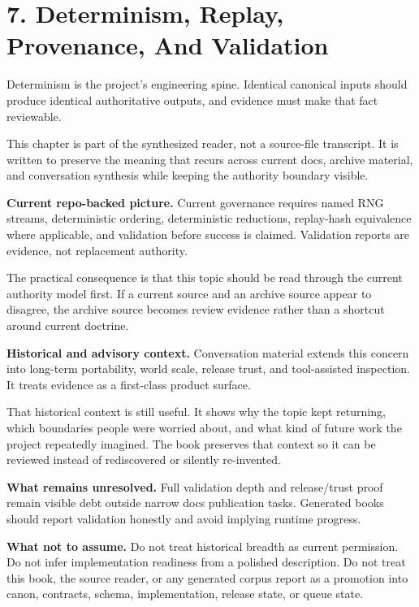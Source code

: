 \documentclass[10.5pt,a4paper,openany]{book}
\begin{document}
\section{7. Determinism, Replay, Provenance, And Validation}

Determinism is the project's engineering spine.\allowbreak{} Identical canonical inputs should produce identical authoritative outputs, and evidence must make that fact reviewable.\allowbreak{}


This chapter is part of the synthesized reader, not a source-\allowbreak{}file transcript.\allowbreak{} It is written to preserve the meaning that recurs across current docs, archive material, and conversation synthesis while keeping the authority boundary visible.\allowbreak{}


\textbf{Current repo-backed picture.} Current governance requires named RNG streams, deterministic ordering, deterministic reductions, replay-\allowbreak{}hash equivalence where applicable, and validation before success is claimed.\allowbreak{} Validation reports are evidence, not replacement authority.\allowbreak{}


The practical consequence is that this topic should be read through the current authority model first.\allowbreak{} If a current source and an archive source appear to disagree, the archive source becomes review evidence rather than a shortcut around current doctrine.\allowbreak{}


\textbf{Historical and advisory context.} Conversation material extends this concern into long-\allowbreak{}term portability, world scale, release trust, and tool-\allowbreak{}assisted inspection.\allowbreak{} It treats evidence as a first-\allowbreak{}class product surface.\allowbreak{}


That historical context is still useful.\allowbreak{} It shows why the topic kept returning, which boundaries people were worried about, and what kind of future work the project repeatedly imagined.\allowbreak{} The book preserves that context so it can be reviewed instead of rediscovered or silently re-\allowbreak{}invented.\allowbreak{}


\textbf{What remains unresolved.} Full validation depth and release/\allowbreak{}trust proof remain visible debt outside narrow docs publication tasks.\allowbreak{} Generated books should report validation honestly and avoid implying runtime progress.\allowbreak{}


\textbf{What not to assume.} Do not treat historical breadth as current permission.\allowbreak{} Do not infer implementation readiness from a polished description.\allowbreak{} Do not treat this book, the source reader, or any generated corpus report as a promotion into canon, contracts, schema, implementation, release state, or queue state.\allowbreak{}
\end{document}
